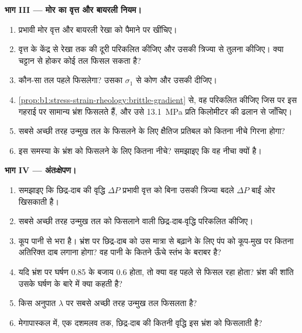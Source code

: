 \begin{problem}
\medskip
\noindent\textbf{भाग III --- मोर का वृत्त और बायरली नियम।}
\begin{enumerate}[resume]
  \item प्रभावी मोर वृत्त और बायरली रेखा को पैमाने पर खींचिए।
  \item वृत्त के केंद्र से रेखा तक की दूरी परिकलित कीजिए और उसकी त्रिज्या से तुलना कीजिए। क्या चट्टान से होकर कोई तल फिसल सकता है?
  \item कौन-सा तल पहले फिसलेगा? उसका $\sigma_1$ से कोण और उसकी  दीजिए।
  \item \cref{prop:b1:stress-strain-rheology:brittle-gradient} से, वह  परिकलित कीजिए जिस पर इस गहराई पर सामान्य भ्रंश फिसलते हैं, और उसे \qty{13.1}{MPa} प्रति किलोमीटर की ढलान से जाँचिए।
  \item सबसे अच्छी तरह उन्मुख तल के फिसलने के लिए क्षैतिज प्रतिबल को कितना नीचे गिरना होगा?
  \item इस समस्या के भ्रंश को फिसलने के लिए कितना नीचे? समझाइए कि वह नीचा क्यों है।
\end{enumerate}

\medskip
\noindent\textbf{भाग IV --- अंतःक्षेपण।}
\begin{enumerate}[resume]
  \item समझाइए कि छिद्र-दाब की वृद्धि $\Delta P$ प्रभावी वृत्त को बिना उसकी त्रिज्या बदले $\Delta P$ बाईं ओर खिसकाती है।
  \item सबसे अच्छी तरह उन्मुख तल को फिसलाने वाली छिद्र-दाब-वृद्धि परिकलित कीजिए।
  \item कूप पानी से भरा है। भ्रंश पर छिद्र-दाब को उस मात्रा से बढ़ाने के लिए पंप को कूप-मुख पर कितना अतिरिक्त दाब लगाना होगा? वह पानी के कितने ऊँचे स्तंभ के बराबर है?
  \item यदि भ्रंश पर घर्षण 0.85 के बजाय 0.6 होता, तो क्या वह पहले से फिसल रहा होता? भ्रंश की शांति उसके घर्षण के बारे में क्या कहती है?
  \item किस अनुपात $\lambda$ पर सबसे अच्छी तरह उन्मुख तल फिसलता है?
  \item मेगापास्कल में, एक दशमलव तक, छिद्र-दाब की कितनी वृद्धि इस भ्रंश को फिसलाती है?
\end{enumerate}
\end{problem}
